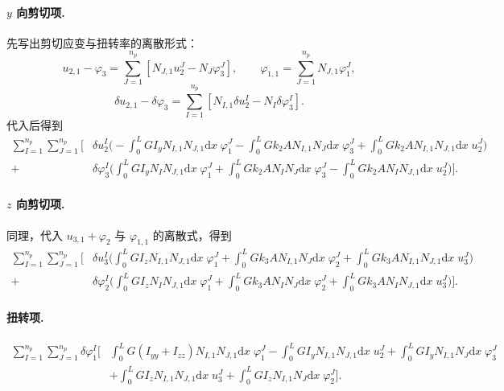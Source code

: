 \documentclass[UTF8,a4paper,11pt]{ctexart}
\newcommand{\ud}{\mathrm{d}}
\begin{document}
\paragraph{$y$ 向剪切项.}
先写出剪切应变与扭转率的离散形式：
\begin{equation}
u_{2,1}-\varphi_3=\sum_{J=1}^{n_p}\left[N_{J,1}u_2^J-N_J\varphi_3^J\right],
\qquad
\varphi_{1,1}=\sum_{J=1}^{n_p}N_{J,1}\varphi_1^J,
\end{equation}
\begin{equation}
\delta u_{2,1}-\delta\varphi_3
=\sum_{I=1}^{n_p}\left[N_{I,1}\delta u_2^I-N_I\delta\varphi_3^I\right].
\end{equation}
代入后得到
\begin{equation}\label{eq:shear2}
\begin{aligned}
\sum_{I=1}^{n_p}\sum_{J=1}^{n_p}\Bigg[
&\delta u_2^I\Big(-\int_0^L GI_yN_{I,1}N_{J,1}\ud x\;\varphi_1^J
-\int_0^L Gk_2AN_{I,1}N_J\ud x\;\varphi_3^J
+\int_0^L Gk_2AN_{I,1}N_{J,1}\ud x\;u_2^J\Big)\\
+&\delta\varphi_3^I\Big(\int_0^L GI_yN_IN_{J,1}\ud x\;\varphi_1^J
+\int_0^L Gk_2AN_IN_J\ud x\;\varphi_3^J
-\int_0^L Gk_2AN_IN_{J,1}\ud x\;u_2^J\Big)\Bigg].
\end{aligned}
\end{equation}

\paragraph{$z$ 向剪切项.}
同理，代入 $u_{3,1}+\varphi_2$ 与 $\varphi_{1,1}$ 的离散式，得到
\begin{equation}\label{eq:shear3}
\begin{aligned}
\sum_{I=1}^{n_p}\sum_{J=1}^{n_p}\Bigg[
&\delta u_3^I\Big(\int_0^L GI_zN_{I,1}N_{J,1}\ud x\;\varphi_1^J
+\int_0^L Gk_3AN_{I,1}N_J\ud x\;\varphi_2^J
+\int_0^L Gk_3AN_{I,1}N_{J,1}\ud x\;u_3^J\Big)\\
+&\delta\varphi_2^I\Big(\int_0^L GI_zN_IN_{J,1}\ud x\;\varphi_1^J
+\int_0^L Gk_3AN_IN_J\ud x\;\varphi_2^J
+\int_0^L Gk_3AN_IN_{J,1}\ud x\;u_3^J\Big)\Bigg].
\end{aligned}
\end{equation}

\paragraph{扭转项.}
\begin{equation}\label{eq:torsion}
\begin{aligned}
\sum_{I=1}^{n_p}\sum_{J=1}^{n_p}\delta\varphi_1^I\Bigg[
&\int_0^L G\left(I_{yy}+I_{zz}\right)N_{I,1}N_{J,1}\ud x\;\varphi_1^J
-\int_0^L GI_yN_{I,1}N_{J,1}\ud x\;u_2^J
+\int_0^L GI_yN_{I,1}N_J\ud x\;\varphi_3^J\\
&+\int_0^L GI_zN_{I,1}N_{J,1}\ud x\;u_3^J
+\int_0^L GI_zN_{I,1}N_J\ud x\;\varphi_2^J\Bigg].
\end{aligned}
\end{equation}
\end{document}
